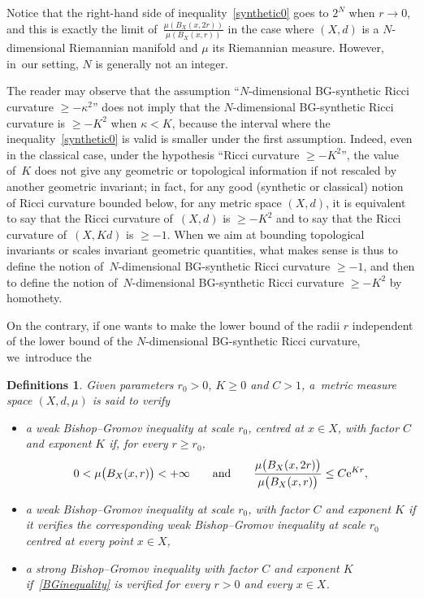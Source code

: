 \documentclass[pdftex]{sigma}
\numberwithin{equation}{section}
\newtheorem{defis}[theor]{Definitions}
\newcommand{\f}{\rightarrow}
\begin{document}
Notice that the right-hand side of inequality~\eqref{synthetic0} goes to $2^N$ when $r\f 0$, and this is exactly the limit of~$\frac{\mu (B_X(x, 2 r))}{\mu ( B_X(x,r))}$ in the case where $(X,d)$ is a $N$-dimensional Riemannian manifold and $\mu$ its Riemannian measure. However, in~our setting, $N$ is generally not an integer.

The reader may observe that the assumption ``$N$-dimensional BG-synthetic Ricci curvature \mbox{$\ge - \kappa^2$}'' does not imply that the $N$-dimensional
BG-synthetic Ricci curvature is $\ge - K^2$ when $\kappa < K$, because the interval where the inequality~\eqref{synthetic0} is valid is smaller under the first
assumption. Indeed, even in the classical case, under the hypothesis ``Ricci curvature $\ge -K^2$'', the value of~$K$ does not give any geometric or topological information if
not rescaled by ano\-ther geo\-met\-ric invariant; in fact, for any good (synthetic or classical) notion of Ricci curvature bounded below, for any metric space
$(X,d)$, it is equivalent to say that the Ricci curvature of~$(X,d)$ is $\ge - K^2$ and to say that the Ricci curvature of~$(X, K d)$ is $\ge - 1$. When we aim at
bounding topological invariants or scales invariant geometric quantities,
what makes sense is thus to define the notion of~$N$-dimensional BG-synthetic
Ricci curvature $\ge - 1$, and then to define the notion of~$N$-dimensional BG-synthetic Ricci curvature $\ge - K^2$ by homothety.

On the contrary, if one wants to make the lower bound of the radii $r$ independent of the lower bound of the $N$-dimensional
BG-synthetic Ricci curvature, we~introduce the


\begin{defis}\label{generalframe0}
Given parameters $r_0> 0$, $ K \ge 0$ and $ C > 1$, a~metric measure space $(X,d,\mu)$ is said to verify
\begin{itemize}\itemsep=0pt
\item[$(i)$]
a weak Bishop--Gromov inequality at scale $r_0$, centred at $x \in X$, with factor $C$ and exponent $K$ if, for every $r \ge r_0$,
\begin{gather}\label{BGinequality}
 0 < \mu \big(B_X(x, r)\big) < +\infty \qquad \text{and} \qquad \frac{\mu \big( B_X(x, 2 r)\big)}{\mu \big( B_X(x,r)\big)} \le C {\rm e}^{K r},
\end{gather}
\item[$(ii)$]
a weak Bishop--Gromov inequality at scale $r_0$, with factor $C$ and exponent $K$ if it verifies the
corresponding weak Bishop--Gromov inequality at scale $r_0$ centred at every point \mbox{$x \in X$},
\item[$(iii)$]
a strong Bishop--Gromov inequality with factor $C$ and exponent $K$ if~\eqref{BGinequality} is verified for every $r > 0$ and every $x \in X$.
\end{itemize}
\end{defis}
\end{document}
